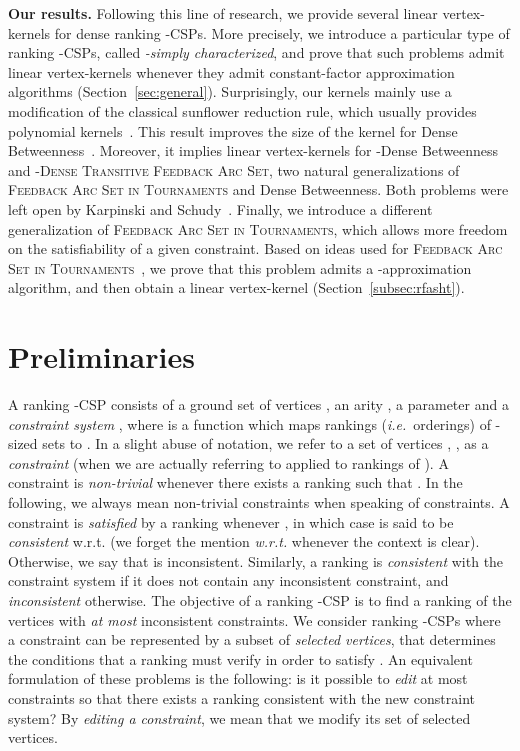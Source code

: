 \documentclass[11pt]{article}
\def\ie{{\em i.e.}~}
\newcommand{\BIT}{{\sc Dense Betweenness}}
\newcommand{\FAST}{\textsc{Feedback Arc Set in Tournaments}}
\newcommand{\rBIT}{{\sc -Dense Betweenness}}
\newcommand{\rFAST}{\textsc{-Dense Transitive Feedback Arc Set}}
\begin{document}
\noindent \textbf{Our results.} Following this line of research, we provide several linear  vertex-kernels for dense ranking -CSPs. 
More precisely, we introduce a particular type of 
ranking -CSPs, called \emph{-simply characterized}, and prove that such problems admit linear vertex-kernels whenever they admit constant-factor approximation algorithms (Section~\ref{sec:general}). Surprisingly, our kernels mainly 
use a modification of the classical sunflower reduction rule, which usually provides polynomial kernels~\cite{ALS09,BP11,GHPP12}. This result improves the size of the kernel for \BIT{}~\cite{PPT11}. Moreover, it implies linear vertex-kernels for \rBIT{} and \rFAST{}, two natural generalizations of \FAST{} and \BIT{}. Both problems were left open by Karpinski and Schudy~\cite{KS11}. 
Finally, we introduce a different generalization of \FAST{}, which allows more freedom on the satisfiability of a given constraint. 
Based on ideas used for \FAST{}~\cite{CFR06}, we prove that this problem admits a -approximation algorithm, and then obtain a linear vertex-kernel (Section~\ref{subsec:rfasht}). 

\section{Preliminaries}
\label{sec:prelim}

A ranking -CSP consists of a ground set of vertices , an arity , a parameter  and a \emph{constraint system} , where  is a function which maps rankings (\ie orderings) of -sized sets  to . In a slight abuse of notation, we refer to a set of vertices , , as a \emph{constraint} (when we are actually referring to  applied to rankings of ). A constraint  is \emph{non-trivial} whenever there exists a ranking  such that . In the following, we always mean non-trivial constraints when speaking of constraints. A constraint  is \emph{satisfied} by a ranking  whenever , in which case  is said to be \emph{consistent} w.r.t.  (we forget the mention \emph{w.r.t. } whenever the context is clear). Otherwise, we say that  is inconsistent. 
Similarly, a ranking  is \emph{consistent} with the constraint system  if it does not contain any inconsistent constraint, and \emph{inconsistent} otherwise. The objective of a ranking -CSP is to find a ranking of the vertices 
with \emph{at most } inconsistent constraints. 
We consider ranking -CSPs where a constraint  can 
be represented by a subset  of \emph{selected vertices}, that determines  the conditions that a ranking must verify in order to satisfy . 
An equivalent formulation of these problems is the 
following: is it possible to \emph{edit} at most  constraints so that there exists 
a ranking consistent with the new constraint system? By \emph{editing a constraint}, 
we mean that we modify its set of selected vertices. \\
\end{document}
